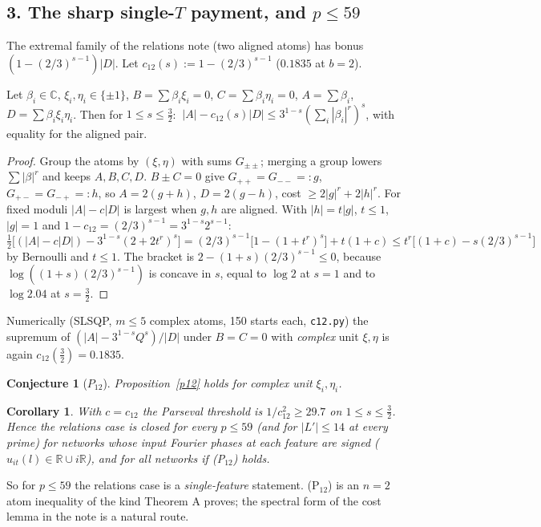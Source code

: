 \documentclass[11pt]{article}
\newtheorem{corollary}[theorem]{Corollary}\newtheorem{conjecture}[theorem]{Conjecture}
\theoremstyle{remark}\newtheorem{remark}[theorem]{Remark}
\begin{document}
\subsection*{3. The sharp single-$T$ payment, and $p\le59$}
The extremal family of the relations note (two aligned atoms) has bonus $(1-(2/3)^{s-1})|D|$.  Let
$c_{12}(s):=1-(2/3)^{s-1}$ ($0.1835$ at $b=2$).
\begin{proposition}\label{p12}
Let $\beta_i\in\mathbb C$, $\xi_i,\eta_i\in\{\pm1\}$, $B=\sum\beta_i\xi_i=0$, $C=\sum\beta_i\eta_i=0$, $A=\sum\beta_i$, $D=\sum\beta_i\xi_i\eta_i$.  Then for
$1\le s\le\frac32$: $\ |A|-c_{12}(s)|D|\le3^{1-s}(\sum_i|\beta_i|^r)^s$, with equality for the aligned pair.
\end{proposition}
\begin{proof}
Group the atoms by $(\xi,\eta)$ with sums $G_{\pm\pm}$; merging a group lowers $\sum|\beta|^r$ and keeps $A,B,C,D$.  $B\pm C=0$ give
$G_{++}=G_{--}=:g$, $G_{+-}=G_{-+}=:h$, so $A=2(g+h)$, $D=2(g-h)$, cost $\ge2|g|^r+2|h|^r$.  For fixed moduli $|A|-c|D|$ is largest when
$g,h$ are aligned.  With $|h|=t|g|$, $t\le1$, $|g|=1$ and $1-c_{12}=(2/3)^{s-1}=3^{1-s}2^{s-1}$:
\[\tfrac12\big[(|A|-c|D|)-3^{1-s}(2+2t^r)^s\big]=(2/3)^{s-1}\big[1-(1+t^r)^s\big]+t(1+c)\le t^r\big[(1+c)-s(2/3)^{s-1}\big]\]
by Bernoulli and $t\le1$.  The bracket is $2-(1+s)(2/3)^{s-1}\le0$, because $\log((1+s)(2/3)^{s-1})$ is concave in $s$, equal to $\log2$ at
$s=1$ and to $\log2.04$ at $s=\frac32$.
\end{proof}
Numerically (SLSQP, $m\le5$ complex atoms, 150 starts each, \texttt{c12.py}) the supremum of $(|A|-3^{1-s}Q^s)/|D|$ under $B=C=0$ with
\emph{complex} unit $\xi,\eta$ is again $c_{12}(\frac32)=0.1835$.
\begin{conjecture}[$P_{12}$]
Proposition~\ref{p12} holds for complex unit $\xi_i,\eta_i$.
\end{conjecture}
\begin{corollary}\label{cor59}
With $c=c_{12}$ the Parseval threshold is $1/c_{12}^2\ge29.7$ on $1\le s\le\frac32$.  Hence the relations case is closed for every
$p\le59$ (and for $|L'|\le14$ at every prime) for networks whose input Fourier phases at each feature are signed
($\hat u_{it}(l)\in\mathbb R\cup i\mathbb R$), and for all networks if (P$_{12}$) holds.
\end{corollary}
So for $p\le59$ the relations case is a \emph{single-feature} statement.  (P$_{12}$) is an $n=2$ atom inequality of the kind Theorem A
proves; the spectral form of the cost lemma in the note is a natural route.
\end{document}
